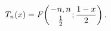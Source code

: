 \[\mathop{T_{n}\/}\nolimits\!\left(x\right)=\mathop{F\/}\nolimits\!\left({-n,n%
\atop\frac{1}{2}};\frac{1-x}{2}\right).\]